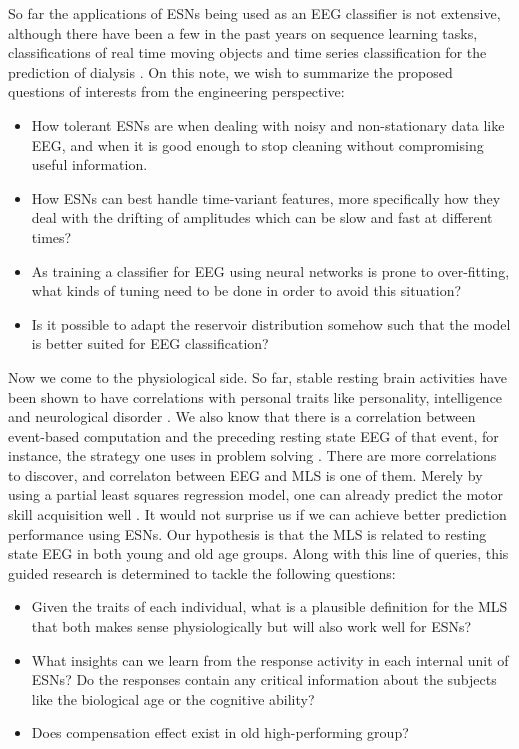 \documentclass[a4paper,11pt,oneside]{article}
\begin{document}
So far the applications of ESNs being used as an EEG classifier is not extensive, although there have been a few in the past years on sequence learning tasks, classifications of real time moving objects \cite{mitul2013classification} and time series classification for the prediction of dialysis \cite{ongenae2013time}. On this note, we wish to summarize the proposed questions of interests from the engineering perspective:
\begin{itemize}
	\item How tolerant ESNs are when dealing with  noisy and non-stationary data like EEG, and when it is good enough to stop cleaning without compromising  useful information.  
	\item How ESNs can best handle time-variant features, more specifically how they deal with the drifting of amplitudes which can be slow and fast at different times?
	\item As training a classifier for EEG using neural networks is prone to over-fitting, what kinds of tuning need to be done in order to avoid this situation?
	\item Is it possible to adapt the reservoir distribution somehow such that the model is better suited for EEG classification?
\end{itemize}

Now we come to the physiological side. So far, stable resting brain activities have been shown to have correlations with personal traits like personality, intelligence and neurological disorder \cite{thatcher2005eeg}\cite{davidson2003affective}. We also know that there is a correlation between event-based computation and the preceding resting state EEG of that event, for instance, the strategy one uses in problem solving \cite{kounios2008origins}. There are more correlations to discover, and correlaton between EEG and MLS is one of them. Merely by using a partial least squares regression model, one can already predict the motor skill acquisition well \cite{wu2014resting}. It would not surprise us if we can achieve better prediction performance using ESNs. Our hypothesis is that the MLS is related to resting state EEG in both young and old age groups. Along with this line of queries, this guided research is determined to tackle the following questions: 

\begin{itemize}
	\item Given the traits of each individual, what is a plausible definition for the MLS that both makes sense physiologically but will also work well for ESNs?
	\item What insights can we learn from the response activity in each internal unit of ESNs? Do the responses contain any critical information about the subjects like the biological age or the cognitive ability?
	\item Does compensation effect exist in old high-performing group?
\end{itemize}
\end{document}
